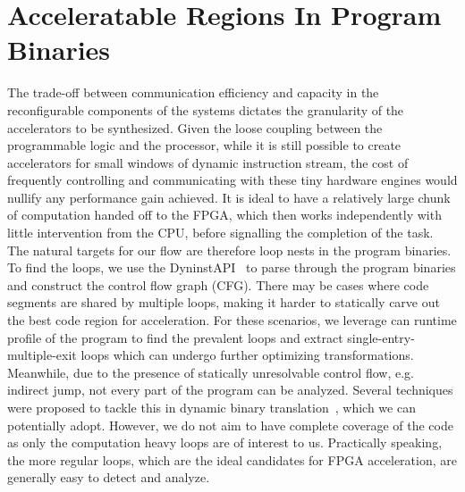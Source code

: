 \section{Acceleratable Regions In Program Binaries}
The trade-off between communication efficiency and capacity
in the reconfigurable components of the systems dictates
the granularity of the accelerators to be synthesized. 
Given the loose coupling between the programmable logic and the processor,
while it is still possible to create accelerators for small windows of dynamic instruction stream, the cost of frequently controlling and communicating
with these tiny hardware engines would nullify any performance gain
achieved. 
It is ideal to have a relatively large chunk of computation
handed off to the FPGA, which then works independently with little
intervention from the CPU, before signalling the completion of the task.
The natural targets for our flow are therefore loop nests in the program
binaries. To find the loops, we use the DyninstAPI~\cite{dyninst} to parse through
the program binaries and construct the control flow graph (CFG). There may be cases where code segments are shared by multiple loops, making it harder to statically carve out the best code region for acceleration. For these
scenarios, we leverage can runtime profile of the program to find the prevalent
loops and extract single-entry-multiple-exit loops which can undergo further
optimizing transformations. 
Meanwhile, due to the presence of statically unresolvable control flow, e.g. indirect jump,
not every part of the program can be analyzed. Several techniques were
proposed to tackle this in dynamic binary translation~\cite{}, which we can potentially
adopt. However, we do not aim to have complete coverage of the code as only the
computation heavy loops are of interest to us.
Practically speaking, the more regular loops, which are the ideal candidates for FPGA acceleration, are generally easy to detect and analyze. 



